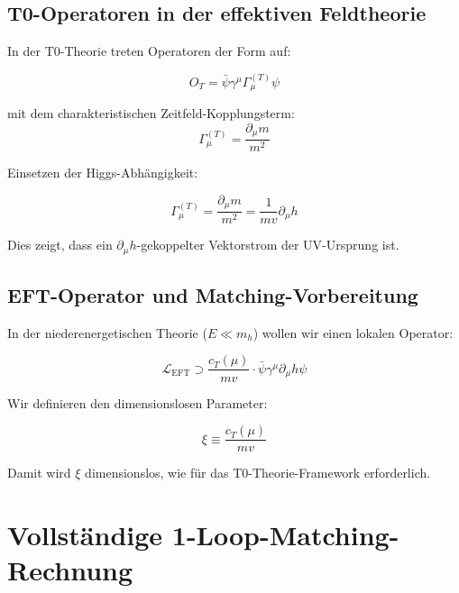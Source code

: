 \documentclass[12pt,a4paper]{article}
\theoremstyle{definition}
\begin{document}
	\subsection{T0-Operatoren in der effektiven Feldtheorie}
	
	In der T0-Theorie treten Operatoren der Form auf:
	
	\begin{equation}
		O_T = \bar{\psi}\gamma^\mu\Gamma_\mu^{(T)}\psi
	\end{equation}
	
	mit dem charakteristischen Zeitfeld-Kopplungsterm:
	\begin{equation}
		\Gamma_\mu^{(T)} = \frac{\partial_\mu m}{m^2}
	\end{equation}
	
	Einsetzen der Higgs-Abhängigkeit:
	
	\begin{formel}
		\begin{equation}
			\Gamma_\mu^{(T)} = \frac{\partial_\mu m}{m^2} = \frac{1}{mv}\partial_\mu h
		\end{equation}
		
		Dies zeigt, dass ein $\partial_\mu h$-gekoppelter Vektorstrom der UV-Ursprung ist.
	\end{formel}
	
	\subsection{EFT-Operator und Matching-Vorbereitung}
	
	In der niederenergetischen Theorie ($E \ll m_h$) wollen wir einen lokalen Operator:
	
	\begin{equation}
		\mathcal{L}_{\text{EFT}} \supset \frac{c_T(\mu)}{mv} \cdot \bar{\psi}\gamma^\mu\partial_\mu h \psi
	\end{equation}
	
	Wir definieren den dimensionslosen Parameter:
	
	\begin{formel}
		\begin{equation}
			\xi \equiv \frac{c_T(\mu)}{mv}
		\end{equation}
		
		Damit wird $\xi$ dimensionslos, wie für das T0-Theorie-Framework erforderlich.
	\end{formel}
	
	\section{Vollständige 1-Loop-Matching-Rechnung}
	
\end{document}
